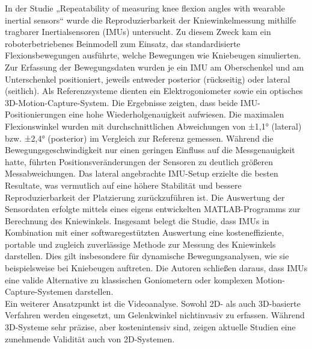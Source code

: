 \noindent In der Studie „Repeatability of measuring knee flexion angles with wearable inertial sensors“ wurde die Reproduzierbarkeit der Kniewinkelmessung mithilfe tragbarer Inertialsensoren (IMUs) untersucht. Zu diesem Zweck kam ein roboterbetriebenes Beinmodell zum Einsatz, das standardisierte Flexionsbewegungen ausführte, welche Bewegungen wie Kniebeugen simulierten. Zur Erfassung der Bewegungsdaten wurden je ein IMU am Oberschenkel und am Unterschenkel positioniert, jeweils entweder posterior (rückseitig) oder lateral (seitlich). Als Referenzsysteme dienten ein Elektrogoniometer sowie ein optisches 3D-Motion-Capture-System. Die Ergebnisse zeigten, dass beide IMU-Positionierungen eine hohe Wiederholgenauigkeit aufwiesen. Die maximalen Flexionswinkel wurden mit durchschnittlichen Abweichungen von ±1,1° (lateral) bzw. ±2,4° (posterior) im Vergleich zur Referenz gemessen. Während die Bewegungsgeschwindigkeit nur einen geringen Einfluss auf die Messgenauigkeit hatte, führten Positionsveränderungen der Sensoren zu deutlich größeren Messabweichungen. Das lateral angebrachte IMU-Setup erzielte die besten Resultate, was vermutlich auf eine höhere Stabilität und bessere Reproduzierbarkeit der Platzierung zurückzuführen ist. Die Auswertung der Sensordaten erfolgte mittels eines eigens entwickelten MATLAB-Programms zur Berechnung des Kniewinkels. Insgesamt belegt die Studie, dass IMUs in Kombination mit einer softwaregestützten Auswertung eine kosteneffiziente, portable und zugleich zuverlässige Methode zur Messung des Kniewinkels darstellen. Dies gilt insbesondere für dynamische Bewegungsanalysen, wie sie beispielsweise bei Kniebeugen auftreten. Die Autoren schließen daraus, dass IMUs eine valide Alternative zu klassischen Goniometern oder komplexen Motion-Capture-Systemen darstellen. \cite{Fennema2019}
\\
\noindent Ein weiterer Ansatzpunkt ist die Videoanalyse. Sowohl 2D- als auch 3D-basierte Verfahren werden eingesetzt, um Gelenkwinkel nichtinvasiv zu erfassen. Während 3D-Systeme sehr präzise, aber kostenintensiv sind, zeigen aktuelle Studien eine zunehmende Validität auch von 2D-Systemen. 
\\
